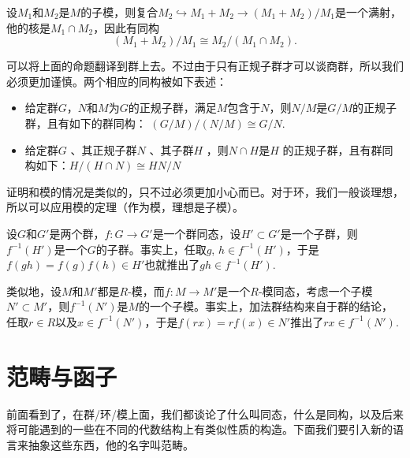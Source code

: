 \para \label{modiso1}设$M_1$和$M_2$是$M$的子模，则复合$M_2\hookrightarrow M_1+M_2 \to (M_1+M_2)/M_1$是一个满射，他的核是$M_1\cap M_2$，因此有同构
\[
	(M_1+M_2)/M_1\cong M_2/(M_1\cap M_2).
\]

\para 可以将上面的命题翻译到群上去。不过由于只有正规子群才可以谈商群，所以我们必须更加谨慎。两个相应的同构被如下表述：

\begin{itemize}
\item 给定群$G$，$N$和$M$为$G$的正规子群，满足$M$包含于$N$，则$N/M$是$G/M$的正规子群，且有如下的群同构： $ (G/M)/(N/M)\cong G/N$.

\item 给定群$G$ 、其正规子群$N$ 、其子群$H$ ，则$N\cap H$是$H$ 的正规子群，且有群同构如下：$H/(H\cap N)\cong HN/N$
\end{itemize}

证明和模的情况是类似的，只不过必须更加小心而已。对于环，我们一般谈理想，所以可以应用模的定理（作为模，理想是子模）。

\para 设$G$和$G'$是两个群，$f:G\to G'$是一个群同态，设$H'\subset G'$是一个子群，则$f^{-1}(H')$是一个$G$的子群。事实上，任取$g$, $h\in f^{-1}(H')$，于是$f(gh)=f(g)f(h)\in H'$也就推出了$gh\in f^{-1}(H')$. 

类似地，设$M$和$M'$都是$R$-模，而$f:M\to M'$是一个$R$-模同态，考虑一个子模$N'\subset M'$，则$f^{-1}(N')$是$M$的一个子模。事实上，加法群结构来自于群的结论，任取$r\in R$以及$x\in f^{-1}(N')$，于是$f(rx)=rf(x)\in N'$推出了$rx\in f^{-1}(N')$. 

\section{范畴与函子}

前面看到了，在群/环/模上面，我们都谈论了什么叫同态，什么是同构，以及后来将可能遇到的一些在不同的代数结构上有类似性质的构造。下面我们要引入新的语言来抽象这些东西，他的名字叫范畴。

